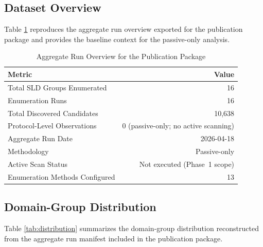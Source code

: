 \documentclass[preprint,review,12pt]{elsarticle}
\begin{document}
\subsection{Dataset Overview}

Table \ref{tab:summary} reproduces the aggregate run overview exported for the publication package and provides the baseline context for the passive-only analysis.

\begin{table}[H]
\centering
\caption{Aggregate Run Overview for the Publication Package}
\label{tab:summary}
\begin{tabular}{|l|r|}
\hline
Metric & Value \\
\hline
Total SLD Groups Enumerated & 16 \\
\hline
Enumeration Runs & 16 \\
\hline
Total Discovered Candidates & 10,638 \\
\hline
Protocol-Level Observations & 0 (passive-only; no active scanning) \\
\hline
Aggregate Run Date & 2026-04-18 \\
\hline
Methodology & Passive-only \\
\hline
Active Scan Status & Not executed (Phase~1 scope) \\
\hline
Enumeration Methods Configured & 13 \\
\hline
\end{tabular}
\end{table}

\subsection{Domain-Group Distribution}

Table \ref{tab:distribution} summarizes the domain-group distribution reconstructed from the aggregate run manifest included in the publication package.
\end{document}
